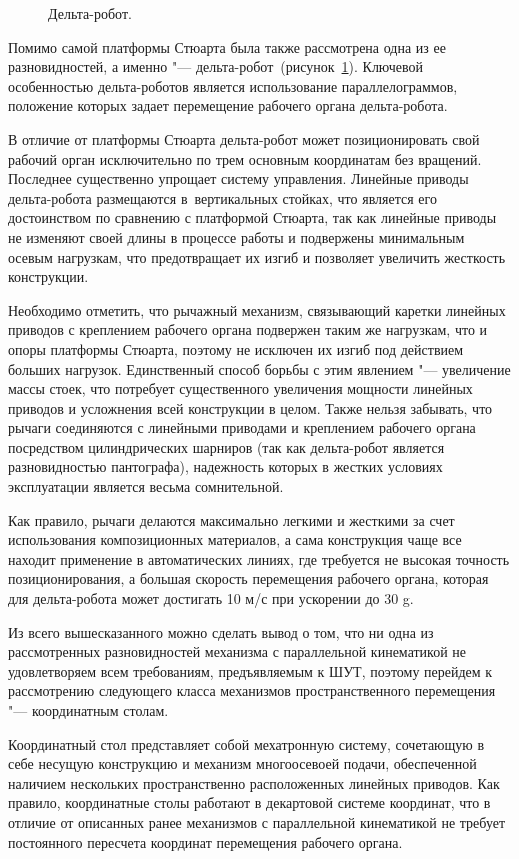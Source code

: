 \begin{figure}[ht]
	\caption{Дельта-робот.}\label{fig:delta}
\end{figure}

Помимо самой платформы Стюарта была также рассмотрена одна из ее разновидностей, а именно "--- дельта-робот~(рисунок~\cref{fig:delta}). Ключевой особенностью дельта-роботов является использование параллелограммов, положение которых задает перемещение рабочего органа дельта-робота.

В отличие от платформы Стюарта дельта-робот может позиционировать свой рабочий орган исключительно по трем основным координатам без вращений. Последнее существенно упрощает систему управления. Линейные приводы дельта-робота размещаются в~вертикальных стойках, что является его достоинством по сравнению с платформой Стюарта, так как линейные приводы не изменяют своей длины в процессе работы и подвержены минимальным осевым нагрузкам, что предотвращает их изгиб и позволяет увеличить жесткость конструкции.

Необходимо отметить, что рычажный механизм, связывающий каретки линейных приводов с креплением рабочего органа подвержен таким же нагрузкам, что и опоры платформы Стюарта, поэтому не исключен их изгиб под действием больших нагрузок. Единственный способ борьбы с этим явлением "--- увеличение массы стоек, что потребует существенного увеличения мощности линейных приводов и усложнения всей конструкции в целом. Также нельзя забывать, что рычаги соединяются с линейными приводами и креплением рабочего органа посредством цилиндрических шарниров (так как дельта-робот является разновидностью пантографа), надежность которых в жестких условиях эксплуатации является весьма сомнительной.

Как правило, рычаги делаются максимально легкими и жесткими за счет использования композиционных материалов, а сама конструкция чаще все находит применение в автоматических линиях, где требуется не высокая точность позиционирования, а большая скорость перемещения рабочего органа, которая для дельта-робота может достигать 10 м/с при ускорении до 30 g.

Из всего вышесказанного можно сделать вывод о том, что ни одна из рассмотренных разновидностей механизма с параллельной кинематикой не удовлетворяем всем требованиям, предъявляемым к ШУТ, поэтому перейдем к рассмотрению следующего класса механизмов пространственного перемещения "--- координатным столам.

Координатный стол представляет собой мехатронную систему, сочетающую в себе несущую конструкцию и механизм многоосевоей подачи, обеспеченной наличием нескольких пространственно расположенных линейных приводов. Как правило, координатные столы работают в декартовой системе координат, что в отличие от описанных ранее механизмов с параллельной кинематикой не требует постоянного пересчета координат перемещения рабочего органа.

